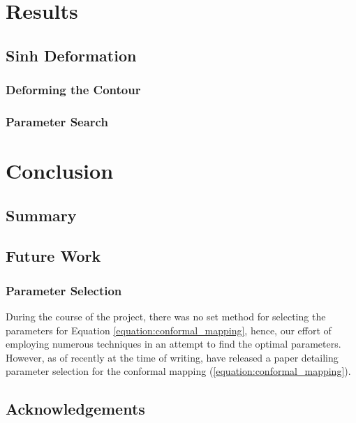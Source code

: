 \documentclass[a4paper]{report}
\begin{document}
\chapter{Results}

\section{Sinh Deformation}

\subsection{Deforming the Contour}

\subsection{Parameter Search}

\chapter{Conclusion}
\section{Summary}

\section{Future Work}

\subsection{Parameter Selection}
During the course of the project, there was no set method for selecting the parameters for Equation \ref{equation:conformal_mapping}, hence, our effort of employing numerous techniques in an attempt to find the optimal parameters. However, as of recently at the time of writing, \citet{boyarchenko2024efficient} have released a paper detailing parameter selection for the conformal mapping (\ref{equation:conformal_mapping}).

\section{Acknowledgements}





\begin{appendices}

% 
    
\end{appendices}
\end{document}
